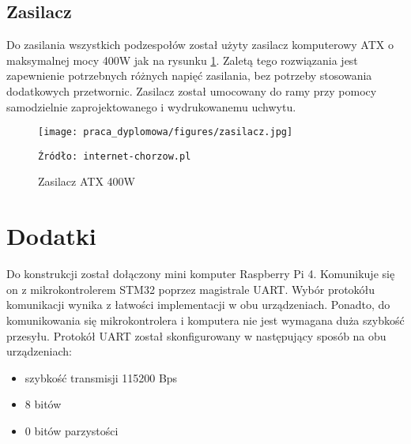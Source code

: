 \subsection{Zasilacz}
Do zasilania wszystkich podzespołów został użyty zasilacz komputerowy ATX o maksymalnej mocy 400W jak na rysunku \ref{fig:zasilacz}. Zaletą tego rozwiązania jest zapewnienie potrzebnych różnych napięć zasilania, bez potrzeby stosowania dodatkowych przetwornic. Zasilacz został umocowany do ramy przy pomocy samodzielnie zaprojektowanego i wydrukowanemu uchwytu.

\begin{figure}
    \centering
    \texttt{[image: praca\_dyplomowa/figures/zasilacz.jpg]}
    \caption{Zasilacz ATX 400W}
    \texttt{Źródło: internet-chorzow.pl}
    \label{fig:zasilacz}
\end{figure}

\section{Dodatki}
Do konstrukcji został dołączony mini komputer Raspberry Pi 4. Komunikuje się on z mikrokontrolerem STM32 poprzez magistrale UART. Wybór protokółu komunikacji wynika z łatwości implementacji w obu urządzeniach. Ponadto, do komunikowania się mikrokontrolera i komputera nie jest wymagana duża szybkość przesyłu. Protokół UART został skonfigurowany w następujący sposób na obu urządzeniach:
\begin{itemize}
    \item szybkość transmisji 115200 Bps
    \item 8 bitów
    \item 0 bitów parzystości
\end{itemize}

